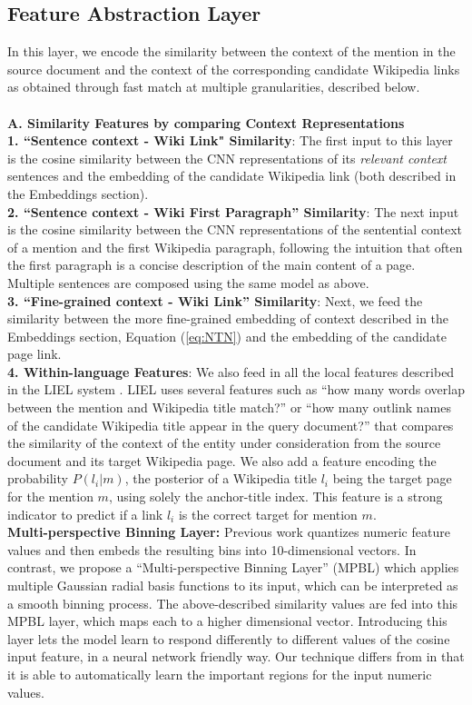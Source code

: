 \documentclass[letterpaper]{article} \usepackage{aaai18}  \usepackage{times}  \usepackage{helvet}  \usepackage{courier}  \usepackage{url}  \usepackage{graphicx}  \frenchspacing  \setlength{\pdfpagewidth}{8.5in}  \setlength{\pdfpageheight}{11in}  \usepackage{latexsym}
\begin{document}
\subsection{Feature Abstraction Layer}
\label{sec:feature-layer}
In this layer, we encode the similarity between the context of the mention in the source document and the context of the corresponding candidate Wikipedia links as obtained through fast match at multiple granularities, described below. \\\\
\textbf{A. Similarity Features by comparing Context Representations}\\
\textbf{1. ``Sentence context - Wiki Link" Similarity}:
The first input to this layer is the cosine similarity between the CNN representations of its \emph{relevant context} sentences and the embedding of the candidate Wikipedia link (both described in the Embeddings section).\\ 
\textbf{2. ``Sentence context - Wiki First Paragraph'' Similarity}: The next input is the cosine similarity between the CNN representations of the sentential context of a mention and the first Wikipedia paragraph, following the intuition that often the first paragraph is a concise description of the main content of a page. Multiple sentences are composed using the same model as above.\\
\textbf{3. ``Fine-grained context - Wiki Link'' Similarity}:
Next, we feed the similarity between the more fine-grained embedding of context described in the Embeddings section, Equation (\ref{eq:NTN}) and the embedding of the candidate page link.\\
\textbf{4. Within-language Features}: We also feed in all the local features described in the LIEL system \cite{sil2016one}. LIEL uses several features such as ``how many words overlap between the mention and Wikipedia title match?'' or ``how many outlink names of the candidate Wikipedia title appear in the query document?'' that compares the similarity of the context of the entity under consideration from the source document and its target Wikipedia page. We also add a feature encoding the probability $P(l_i|m)$, the posterior of a Wikipedia title $l_i$ being the target page for the mention $m$, using solely the anchor-title index. This feature is a strong indicator to predict if a link $l_i$ is the correct target for mention $m$.\\
\textbf{Multi-perspective Binning Layer:} Previous work \cite{liu2016neural} quantizes numeric feature values and then embeds the resulting bins into 10-dimensional vectors. In contrast, we propose a ``Multi-perspective Binning Layer'' (MPBL) which applies multiple Gaussian radial basis functions to its input, which can be interpreted as a smooth binning process. The above-described similarity values are fed into this MPBL layer, which maps each to a higher dimensional vector. Introducing this layer lets the model learn to respond differently to different values of the cosine input feature, in a neural network friendly way. Our technique differs from \cite{liu2016neural} in that it is able to automatically learn the important regions for the input numeric values.\\[12pt]
\end{document}
